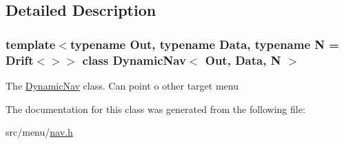 \subsection{Detailed Description}
\subsubsection*{template$<$typename Out, typename Data, typename N = Drift$<$$>$$>$\newline
class Dynamic\+Nav$<$ Out, Data, N $>$}

The \hyperlink{classDynamicNav}{Dynamic\+Nav} class. Can point o other target menu 

The documentation for this class was generated from the following file\+:\begin{DoxyCompactItemize}
\item 
src/menu/\hyperlink{nav_8h}{nav.\+h}\end{DoxyCompactItemize}
